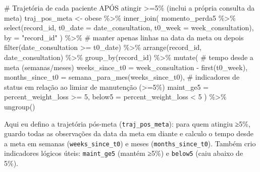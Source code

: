 \documentclass[
]{article}
\newenvironment{Shaded}{\begin{snugshade}}{\end{snugshade}}
\newcommand{\AttributeTok}[1]{\textcolor[rgb]{0.40,0.45,0.13}{#1}}
\newcommand{\CommentTok}[1]{\textcolor[rgb]{0.37,0.37,0.37}{#1}}
\newcommand{\DecValTok}[1]{\textcolor[rgb]{0.68,0.00,0.00}{#1}}
\newcommand{\FunctionTok}[1]{\textcolor[rgb]{0.28,0.35,0.67}{#1}}
\newcommand{\NormalTok}[1]{\textcolor[rgb]{0.00,0.23,0.31}{#1}}
\newcommand{\OtherTok}[1]{\textcolor[rgb]{0.00,0.23,0.31}{#1}}
\newcommand{\SpecialCharTok}[1]{\textcolor[rgb]{0.37,0.37,0.37}{#1}}
\newcommand{\StringTok}[1]{\textcolor[rgb]{0.13,0.47,0.30}{#1}}
\begin{document}
\begin{Shaded}
\begin{Highlighting}[]
\CommentTok{\# Trajetória de cada paciente APÓS atingir \textgreater{}=5\% (inclui a própria consulta da meta)}
\NormalTok{traj\_pos\_meta }\OtherTok{\textless{}{-}}\NormalTok{ obese }\SpecialCharTok{\%\textgreater{}\%}
  \FunctionTok{inner\_join}\NormalTok{(}
\NormalTok{    momento\_perda5 }\SpecialCharTok{\%\textgreater{}\%}
      \FunctionTok{select}\NormalTok{(record\_id, }\AttributeTok{t0\_date =}\NormalTok{ date\_consultation, }\AttributeTok{t0\_week =}\NormalTok{ week\_consultation),}
    \AttributeTok{by =} \StringTok{"record\_id"}
\NormalTok{  ) }\SpecialCharTok{\%\textgreater{}\%}
  \CommentTok{\# manter apenas linhas na data da meta ou depois}
  \FunctionTok{filter}\NormalTok{(date\_consultation }\SpecialCharTok{\textgreater{}=}\NormalTok{ t0\_date) }\SpecialCharTok{\%\textgreater{}\%}
  \FunctionTok{arrange}\NormalTok{(record\_id, date\_consultation) }\SpecialCharTok{\%\textgreater{}\%}
  \FunctionTok{group\_by}\NormalTok{(record\_id) }\SpecialCharTok{\%\textgreater{}\%}
  \FunctionTok{mutate}\NormalTok{(}
    \CommentTok{\# tempo desde a meta (semanas/meses)}
    \AttributeTok{weeks\_since\_t0 =}\NormalTok{ week\_consultation }\SpecialCharTok{{-}} \FunctionTok{first}\NormalTok{(t0\_week),}
    \AttributeTok{months\_since\_t0 =} \FunctionTok{semana\_para\_mes}\NormalTok{(weeks\_since\_t0),}
    \CommentTok{\# indicadores de status em relação ao limiar de manutenção (\textgreater{}=5\%)}
    \AttributeTok{maint\_ge5 =}\NormalTok{ percent\_weight\_loss }\SpecialCharTok{\textgreater{}=} \DecValTok{5}\NormalTok{,}
    \AttributeTok{below5    =}\NormalTok{ percent\_weight\_loss }\SpecialCharTok{\textless{}} \DecValTok{5}
\NormalTok{  ) }\SpecialCharTok{\%\textgreater{}\%}
  \FunctionTok{ungroup}\NormalTok{()}
\end{Highlighting}
\end{Shaded}

Aqui eu defino a trajetória pós-meta (\texttt{traj\_pos\_meta}): para
quem atingiu ≥5\%, guardo todas as observações da data da meta em diante
e calculo o tempo desde a meta em semanas (\texttt{weeks\_since\_t0}) e
meses (\texttt{months\_since\_t0}). Também crio indicadores lógicos
úteis: \texttt{maint\_ge5} (mantém ≥5\%) e \texttt{below5} (caiu abaixo
de 5\%).
\end{document}
